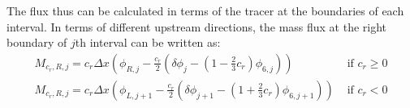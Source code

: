 

The flux thus can be calculated in terms of the tracer at the boundaries of each interval. In terms of different upstream directions, the mass flux at the right boundary of $j$th interval can be written as:
\begin{eqnarray} \label{eq:2.10}
M_{c_r,R,j} = c_r \Delta x (\phi_{R,j}-\frac{c_r}{2}(\delta \phi_j-(1-\frac{2}{3} c_r)\phi_{6,j})) & \text{ if $c_r$}\geqslant 0 \nonumber \\
M_{c_r,R,j} = c_r \Delta x (\phi_{L,j+1}-\frac{c_r}{2}(\delta \phi_{j+1}-(1+\frac{2}{3} c_r)\phi_{6,j+1})) & \text{ if  $c_r$} < 0
\end{eqnarray}

